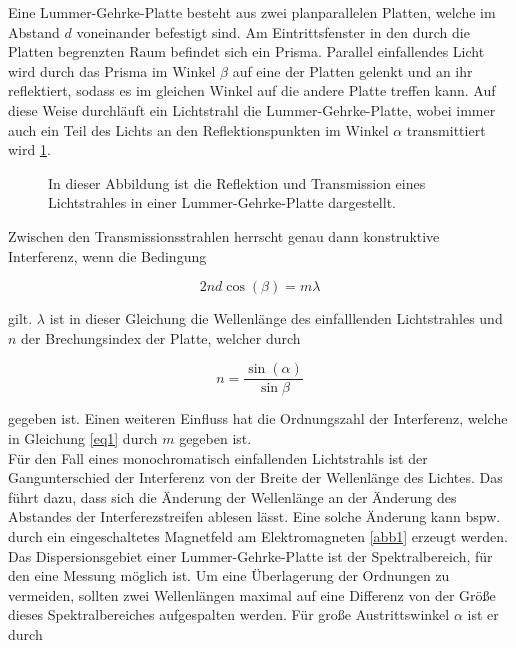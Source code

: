 Eine Lummer-Gehrke-Platte besteht aus zwei planparallelen 
Platten, welche im Abstand $d$ voneinander befestigt sind.
Am Eintrittsfenster in den durch die Platten begrenzten Raum 
befindet sich ein Prisma. Parallel einfallendes Licht
wird durch das Prisma im Winkel $\beta$ auf eine der Platten 
gelenkt und an ihr reflektiert, sodass es im gleichen Winkel 
auf die andere Platte treffen kann. Auf diese Weise durchläuft 
ein Lichtstrahl die Lummer-Gehrke-Platte, wobei immer auch
ein Teil des Lichts an den Reflektionspunkten im Winkel $\alpha$ transmittiert wird \ref{abb2}.

\begin{figure}
    \centering
    \caption{In dieser Abbildung ist die Reflektion und Transmission eines 
    Lichtstrahles in einer Lummer-Gehrke-Platte dargestellt.}
    \label{abb2}
\end{figure}

Zwischen den Transmissionsstrahlen herrscht genau dann 
konstruktive Interferenz, wenn die Bedingung

\begin{equation}
    2nd \cos(\beta) = m \lambda
    \label{eq1}
\end{equation}

gilt. $\lambda$ ist in dieser Gleichung die Wellenlänge des 
einfalllenden Lichtstrahles und $n$ der Brechungsindex der Platte, 
welcher durch 

\begin{equation}
    n = \frac{\sin(\alpha)}{\sin{\beta}}
    \label{eq2}
\end{equation}

gegeben ist. Einen weiteren Einfluss hat die Ordnungszahl der 
Interferenz, welche in Gleichung \ref{eq1} durch $m$
gegeben ist.\\
Für den Fall eines monochromatisch einfallenden 
Lichtstrahls ist der Gangunterschied der Interferenz von der
Breite der Wellenlänge des Lichtes. 
Das führt dazu, dass sich die Änderung der Wellenlänge an der 
Änderung des Abstandes der Interferezstreifen ablesen lässt.
Eine solche Änderung kann bspw. durch ein eingeschaltetes 
Magnetfeld am Elektromagneten \ref{abb1} erzeugt werden.\\
Das Dispersionsgebiet einer Lummer-Gehrke-Platte ist 
der Spektralbereich, für den eine Messung möglich ist. 
Um eine Überlagerung der Ordnungen zu vermeiden, sollten 
zwei Wellenlängen maximal auf eine Differenz von der 
Größe dieses Spektralbereiches aufgespalten werden. 
Für große Austrittswinkel $\alpha$ ist er durch 

